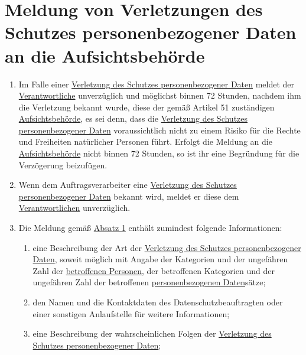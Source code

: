 \chapter{Meldung von Verletzungen des Schutzes personenbezogener Daten an die Aufsichtsbehörde}
\label{ch:33}


\begin{enumerate}

  \item Im Falle einer \hyperref[itm:04-12]{Verletzung des Schutzes personenbezogener Daten} meldet der \hyperref[itm:04-7]{Verantwortliche} unverzüglich und
   möglichst binnen 72 Stunden, nachdem ihm die Verletzung bekannt wurde, diese der gemäß Artikel 51 zuständigen
   \hyperref[itm:04-21]{Aufsichtsbehörde}, es sei denn, dass die \hyperref[itm:04-12]{Verletzung des Schutzes personenbezogener Daten} voraussichtlich nicht zu
   einem Risiko für die Rechte und Freiheiten natürlicher Personen führt. Erfolgt die Meldung an die \hyperref[itm:04-21]{Aufsichtsbehörde}
   nicht binnen 72 Stunden, so ist ihr eine Begründung für die Verzögerung beizufügen.
  \label{itm:33-1}

  \item Wenn dem Auftragsverarbeiter eine \hyperref[itm:04-12]{Verletzung des Schutzes personenbezogener Daten} bekannt wird, meldet er diese
   dem \hyperref[itm:04-7]{Verantwortlichen} unverzüglich.
  \label{itm:33-2}

  \item Die Meldung gemäß \hyperref[itm:33-1]{Absatz 1} enthält zumindest folgende Informationen:
  \label{itm:33-3}

  \begin{enumerate}
  
    \item eine Beschreibung der Art der \hyperref[itm:04-12]{Verletzung des Schutzes personenbezogener Daten}, soweit möglich mit Angabe der
     Kategorien und der ungefähren Zahl der \hyperref[itm:04-1]{betroffenen Personen}, der betroffenen Kategorien und der ungefähren Zahl
     der betroffenen \hyperref[itm:04-1]{personenbezogenen Daten}sätze;
    \label{itm:33-3a}

    \item den Namen und die Kontaktdaten des Datenschutzbeauftragten oder einer sonstigen Anlaufstelle für weitere
     Informationen;
    \label{itm:33-3b}

    \item eine Beschreibung der wahrscheinlichen Folgen der \hyperref[itm:04-12]{Verletzung des Schutzes personenbezogener Daten};
    \label{itm:33-3c}


\end{enumerate}
\end{enumerate}

